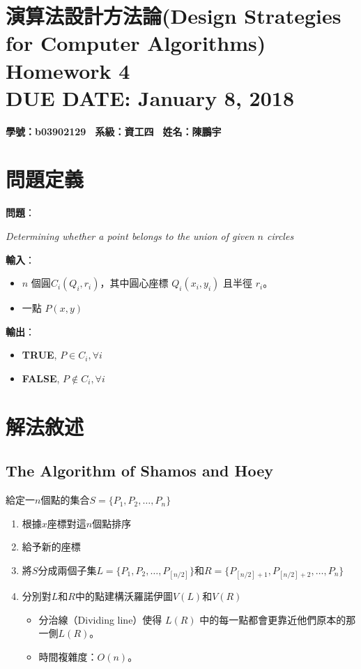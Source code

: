 \documentclass[15pt]{extarticle}
\newcommand{\hmwkClass}{演算法設計方法論(Design Strategies for Computer Algorithms)}
\newcommand{\hmwkTitle}{Homework 4}
\newcommand{\hmwkDueDate}{January 8, 2018}
\begin{document}
\thispagestyle{empty}
\section*{\hmwkClass \\
    \normalsize{\hmwkTitle} \\
    \normalsize{DUE DATE: \hmwkDueDate}
}

\hfill \textbf{學號：b03902129 \, 系級：資工四 \, 姓名：陳鵬宇} \\

\section{問題定義}

\vskip3mm
\textbf{問題}：\begin{minipage}[t]{0.8\linewidth}
    \textit{Determining whether a point belongs to the union of given $n$ circles} \vskip0mm
\end{minipage}
\vskip3mm
\textbf{輸入}：
\begin{minipage}[t]{0.8\linewidth}
\begin{itemize}
    \item $n$ 個圓$C_i(Q_i,r_i)$，其中圓心座標 $Q_i(x_i,y_i)$ 且半徑 $r_i$。
    \item 一點 $P(x,y)$
\end{itemize}
\end{minipage}

\vskip3mm
\textbf{輸出}：
\begin{minipage}[t]{0.8\linewidth}
    \begin{itemize}
        \item \textbf{TRUE}, $P\in C_i,\forall i$
        \item \textbf{FALSE}, $P\notin C_i,\forall i$
    \end{itemize}
\end{minipage}


\section{解法敘述}
\subsection{The Algorithm of Shamos and Hoey}

給定一$n$個點的集合$S=\{P_1,P_2,\dots,P_n\}$
\begin{enumerate}
    \item 根據$x$座標對這$n$個點排序
    \item 給予新的座標
    \item 將$S$分成兩個子集$L=\{P_1,P_2,\dots,P_{[n/2]}\}$和$R=\{P_{[n/2]+1},P_{[n/2]+2},\dots,P_n\}$
    \item 分別對$L$和$R$中的點建構沃羅諾伊圖$V(L)$和$V(R)$
    \begin{itemize}
        \item 分治線（Dividing line）使得 $L(R)$ 中的每一點都會更靠近他們原本的那一側$L(R)$。
        \item 時間複雜度：$O(n)$。
    \end{itemize}
\end{enumerate}
\end{document}
